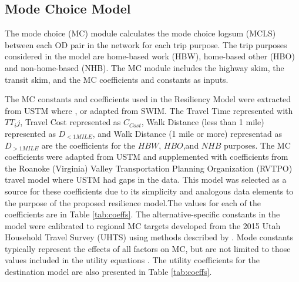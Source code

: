 \subsection{Mode Choice Model}

The mode choice (MC) module calculates the mode choice logsum (MCLS) between each OD pair in the
network for each trip purpose. The trip purposes considered in the model are home-based work
(HBW), home-based other (HBO) and non-home-based (NHB). The MC module includes the highway skim,
the transit skim, and the MC coefficients and constants as inputs.

The MC constants and coefficients used in the Resiliency Model were extracted from USTM where
, or adapted from SWIM. The Travel Time represented with $TT_ij$, Travel Cost represented as $C_{Cost}$, Walk Distance (less than 1 mile) represented as $D_{<1MILE}$, and Walk Distance (1 mile or more) representad as $D_{>1MILE}$ are the coefficients for the
$HBW$, $HBO$,and $NHB$ purposes. The MC coefficients were adapted
from USTM and supplemented with coefficients from the Roanoke (Virginia)
Valley Transportation Planning Organization (RVTPO) travel model where USTM had gaps in the data. This model was
selected as a source for these coefficients due to its simplicity and analogous data elements to the purpose of the proposed resilience model.The
values for each of the coefficients are in Table \ref{tab:coeffs}. The alternative-specific constants in the model were calibrated to regional MC
targets developed from the 2015 Utah Household Travel Survey (UHTS) using
methods described by \citet{koppelman2006}.
Mode constants typically represent the effects of all factors on MC, but are not limited to
those values included in the utility equations \citep{koppelman2006}. The utility coefficients for the destination model are
also presented in Table \ref{tab:coeffs}.

